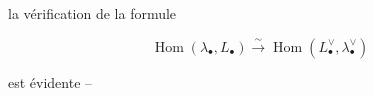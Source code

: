 
la vérification de la formule

\[
 \operatorname{Hom}(\lambda_{\bullet},L_{\bullet})\overset{\sim}{\longrightarrow}\operatorname{Hom}(L_{\bullet}^{\vee},\lambda_{\bullet}^{\vee})
\]

est évidente --

